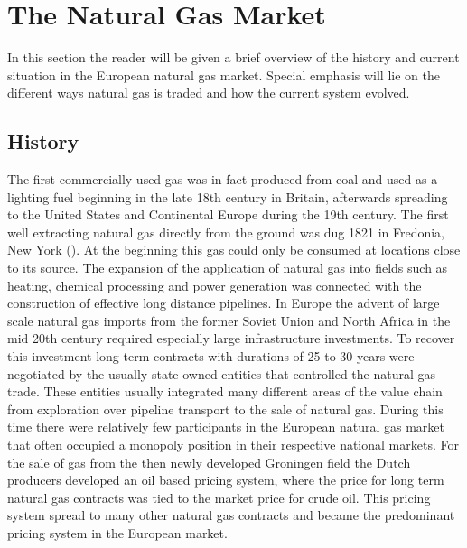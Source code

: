 \chapter{The Natural Gas Market}
In this section the reader will be given a brief overview of the history and current situation in the European natural gas market. Special emphasis will lie on the different ways natural gas is traded and how the current system  evolved. 

\section{History}
The first commercially used gas was in fact produced from coal and used as a lighting fuel beginning in the late 18th century in Britain, afterwards spreading to the United States and Continental Europe during the 19th century. The first well extracting natural gas directly from the ground was dug 1821 in Fredonia, New York (\cite{heather_evolution_2015}). At the beginning this gas could only be consumed at locations close to its source. The expansion of the application of natural gas into fields such as heating, chemical processing and power generation was connected with the construction of effective long distance pipelines. In Europe the advent of large scale natural gas imports from the former Soviet Union and North Africa in the mid 20th century required especially large infrastructure investments. To recover this investment long term contracts with durations of 25 to 30 years were negotiated by the usually state owned entities that controlled the natural gas trade. These entities usually integrated many different areas of the value chain from exploration over pipeline transport to the sale of natural gas. During this time there were relatively few participants in the European natural gas market that often occupied a monopoly position in their respective national markets.
For the sale of gas from the then newly developed Groningen field the Dutch producers developed an oil based pricing system, where the price for long term natural gas contracts was tied to the market price for crude oil. This pricing system spread to many other natural gas contracts and became the predominant pricing system in the European market.

